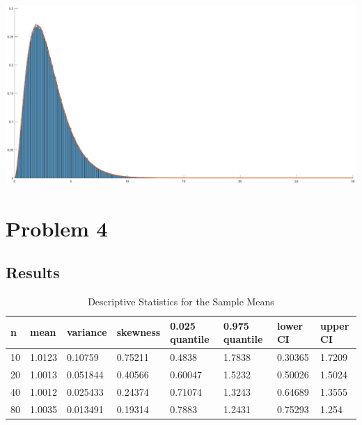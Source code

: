 \documentclass[12pt]{article}
\begin{document}
\includegraphics [width=\textwidth]{prob3_sim_03.eps}

\section{Problem 4}
\subsection{Results}
\begin{table}[h]
\centering
\caption{Descriptive Statistics for the Sample Means}
\label{p4_data}
\begin{tabular}{|l|l|l|l|l|l|l|l|}
  \hline 
n  & mean & variance & skewness & 0.025 quantile & 0.975 quantile & lower CI & upper CI \\
\hline
10 &1.0123& 0.10759  & 0.75211 & 0.4838 & 1.7838 & 0.30365 & 1.7209 \\
\hline
20 &1.0013& 0.051844 & 0.40566 & 0.60047 & 1.5232 & 0.50026 & 1.5024 \\
\hline
40 &1.0012& 0.025433 & 0.24374 & 0.71074 & 1.3243 & 0.64689 & 1.3555 \\
\hline
80 &1.0035& 0.013491 & 0.19314  & 0.7883 & 1.2431 & 0.75293 & 1.254 \\
\hline
\end{tabular}
\end{table}
\end{document}
